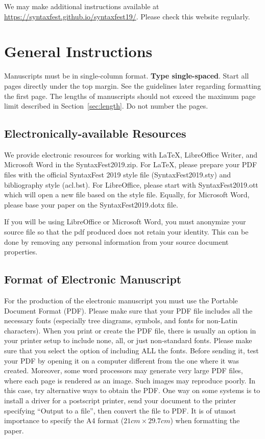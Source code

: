 \documentclass[11pt]{article}
\begin{document}
We may make additional instructions available at \url{https://syntaxfest.github.io/syntaxfest19/}. Please check this website regularly.



\section{General Instructions}

Manuscripts must be in single-column format. \textbf{Type single-spaced}. Start all pages directly under the top margin. See the guidelines later regarding formatting the first page. The lengths of manuscripts should not exceed the maximum page limit described in Section~\ref{sec:length}.
Do not number the pages.


\subsection{Electronically-available Resources}

We provide electronic resources for working with LaTeX, LibreOffice Writer, and Microsoft Word in the SyntaxFest2019.zip. For LaTeX, please prepare your PDF files with the official SyntaxFest 2019 style file (SyntaxFest2019.sty) and bibliography style (acl.bst). For LibreOffice, please start with SyntaxFest2019.ott which will open a new file based on the style file. Equally, for Microsoft Word, please base your paper on the SyntaxFest2019.dotx file.

If you will be using LibreOffice or Microsoft Word, you must anonymize your source file so that the pdf produced does not retain your identity. This can be done by removing any personal information from your source document properties.


\subsection{Format of Electronic Manuscript}
\label{sect:pdf}

For the production of the electronic manuscript you must use the Portable Document Format (PDF). Please make sure that your PDF file includes all the necessary fonts (especially tree diagrams, symbols, and fonts for non-Latin characters). When you print or create the PDF file, there is usually an option in your printer setup to include none, all, or just non-standard fonts. Please make sure that you select the option of including ALL the fonts. Before sending it, test your PDF by opening it on a computer different from the one where it was created. Moreover, some word processors may generate very large PDF files, where each page is rendered as an image. Such images may reproduce poorly. In this case, try alternative ways to obtain the PDF. One way on some systems is to install a driver for a postscript printer, send your document to the printer specifying ``Output to a file'', then convert the file to PDF. It is of utmost importance to specify the A4 format ($ 21 cm \times 29.7 cm $) when formatting the paper. 
\end{document}
